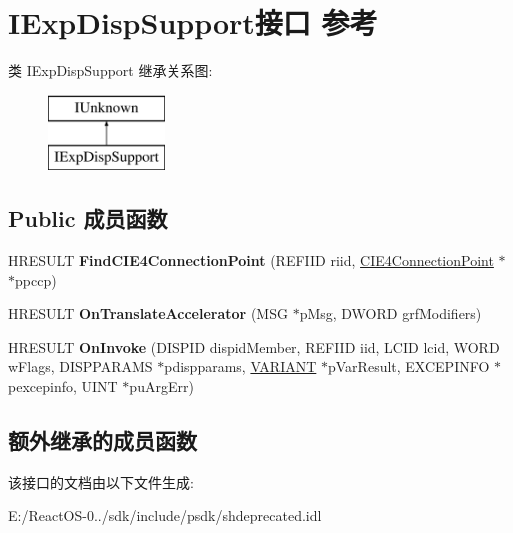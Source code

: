 \hypertarget{interface_i_exp_disp_support}{}\section{I\+Exp\+Disp\+Support接口 参考}
\label{interface_i_exp_disp_support}
类 I\+Exp\+Disp\+Support 继承关系图\+:\begin{figure}[H]
\begin{center}
\leavevmode
\includegraphics[height=2.000000cm]{interface_i_exp_disp_support}
\end{center}
\end{figure}
\subsection*{Public 成员函数}
\begin{DoxyCompactItemize}
\item 
\mbox{\label{interface_i_exp_disp_support_a6d6188c512120980f4fc7173655f9125}} 
H\+R\+E\+S\+U\+LT {\bfseries Find\+C\+I\+E4\+Connection\+Point} (R\+E\+F\+I\+ID riid, \hyperlink{interfacevoid}{C\+I\+E4\+Connection\+Point} $\ast$$\ast$ppccp)
\item 
\mbox{\label{interface_i_exp_disp_support_a5eb6e3af5ef504d25bc8f4c5c5e67bda}} 
H\+R\+E\+S\+U\+LT {\bfseries On\+Translate\+Accelerator} (M\+SG $\ast$p\+Msg, D\+W\+O\+RD grf\+Modifiers)
\item 
\mbox{\label{interface_i_exp_disp_support_ad4b7da8c7dd7d4b4489c2271b771fbed}} 
H\+R\+E\+S\+U\+LT {\bfseries On\+Invoke} (D\+I\+S\+P\+ID dispid\+Member, R\+E\+F\+I\+ID iid, L\+C\+ID lcid, W\+O\+RD w\+Flags, D\+I\+S\+P\+P\+A\+R\+A\+MS $\ast$pdispparams, \hyperlink{structtag_v_a_r_i_a_n_t}{V\+A\+R\+I\+A\+NT} $\ast$p\+Var\+Result, E\+X\+C\+E\+P\+I\+N\+FO $\ast$pexcepinfo, U\+I\+NT $\ast$pu\+Arg\+Err)
\end{DoxyCompactItemize}
\subsection*{额外继承的成员函数}


该接口的文档由以下文件生成\+:\begin{DoxyCompactItemize}
\item 
E\+:/\+React\+O\+S-\/0../sdk/include/psdk/shdeprecated.\+idl\end{DoxyCompactItemize}
